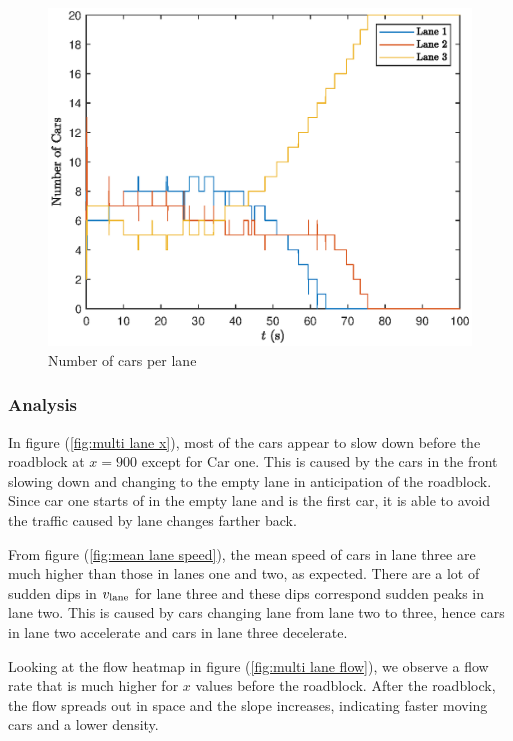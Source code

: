 \documentclass[12pt]{article}
\begin{document}
    \begin{figure}[H]
      \begin{center}
        \includegraphics[width=13cm]{mlbn_lanecars.eps}
        \caption{Number of cars per lane}
        \label{fig:num cars per lane}
      \end{center}
    \end{figure}
    \subsubsection{Analysis}

    In figure (\ref{fig:multi lane x}), most of the cars appear to slow down before the roadblock at $x = 900$ except for Car one. This is caused by the cars in the front slowing down and changing to the empty lane in anticipation of the roadblock. Since car one starts of in the empty lane and is the first car, it is able to avoid the traffic caused by lane changes farther back.
   
    From figure (\ref{fig:mean lane speed}), the mean speed of cars in lane three are much higher than those in lanes one and two, as expected. There are a lot of sudden dips in $v_{\rm lane}$ for lane three and these dips correspond sudden peaks in lane two. This is caused by cars changing lane from lane two to three, hence cars in lane two accelerate and cars in lane three decelerate.

   Looking at the flow heatmap in figure (\ref{fig:multi lane flow}), we observe a  flow rate that is much higher for $x$ values before the roadblock. After the roadblock, the flow spreads out in space and the slope increases, indicating faster moving cars and a lower density.
\end{document}
